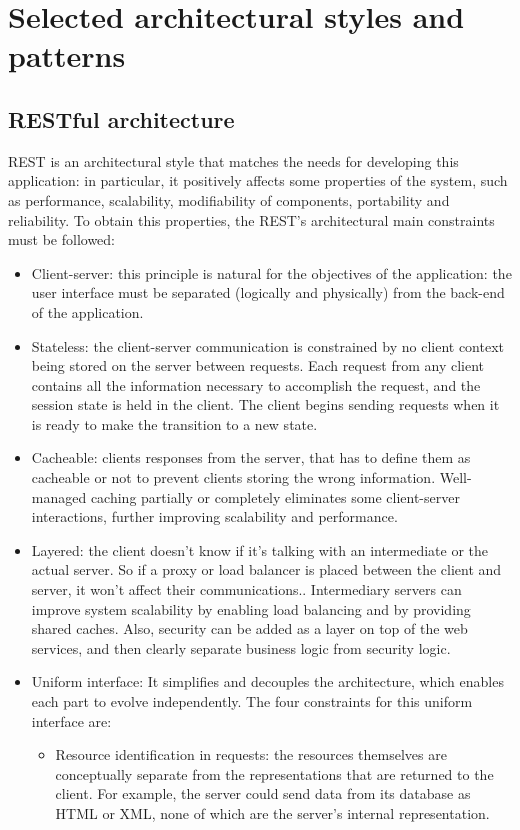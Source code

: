 \documentclass[12pt,a4paper]{report}
\begin{document}
		\section{Selected architectural styles and patterns}
			\subsection{RESTful architecture}
	REST is an architectural style that matches the needs for developing this application: in particular, it positively affects
some properties of the system, such as performance, scalability, modifiability of components, portability and reliability. To obtain this properties, the REST's architectural main constraints must be followed:
\begin{itemize}
	\item{Client-server}: this principle is natural for the objectives of the application: the user interface must be separated (logically and physically) from the back-end of the application.
	\item{Stateless}: the client-server communication is constrained by no client context being stored on the server between requests. Each request from any client contains all the information necessary to accomplish the request, and the session state is held in the client. The client begins sending requests when it is ready to make the transition to a new state.
	\item{Cacheable}: clients  responses from the server, that has to define them as cacheable or not to prevent clients storing the wrong information. Well-managed caching partially or completely eliminates some client-server interactions, further improving scalability and performance.
	\item{Layered}: the client doesn't know if it's talking with an intermediate or the actual server. So if a proxy or load balancer is placed between the client and server, it won't affect their communications.. Intermediary servers can improve system scalability by enabling load balancing and by providing shared caches. Also, security can be added as a layer on top of the web services, and then clearly separate business logic from security logic.
	\item{Uniform interface}: It simplifies and decouples the architecture, which enables each part to evolve independently. The four constraints for this uniform interface are:
	\begin{itemize}
		\item{Resource identification in requests}: the resources themselves are conceptually separate from the representations that are returned to the client. For example, the server could send data from its database as HTML or XML, none of which are the server's internal representation.

\end{itemize}
\end{itemize}
\end{document}

